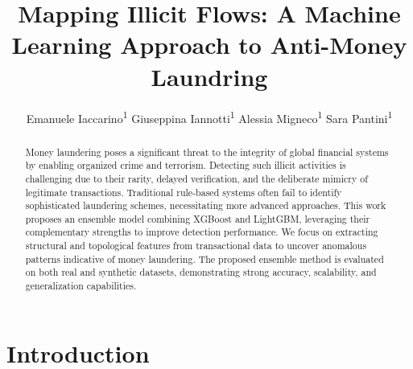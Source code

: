 \documentclass[a4paper]{article}
\title{Mapping Illicit Flows: A Machine Learning Approach to Anti-Money Laundring}
\author{
Emanuele Iaccarino\textsuperscript{1} \quad
Giuseppina Iannotti\textsuperscript{1} \quad
Alessia Migneco\textsuperscript{1} \quad
Sara Pantini\textsuperscript{1}
}
\begin{document}
\maketitle

\begin{abstract}
Money laundering poses a significant threat to the integrity of global financial systems by enabling organized crime and terrorism. Detecting such illicit activities is challenging due to their rarity, delayed verification, and the deliberate mimicry of legitimate transactions. Traditional rule-based systems often fail to identify sophisticated laundering schemes, necessitating more advanced approaches. This work proposes an ensemble model combining XGBoost and LightGBM, leveraging their complementary strengths to improve detection performance. We focus on extracting structural and topological features from transactional data to uncover anomalous patterns indicative of money laundering. The proposed ensemble method is evaluated on both real and synthetic datasets, demonstrating strong accuracy, scalability, and generalization capabilities.
\end{abstract}

\section{Introduction}
\end{document}
